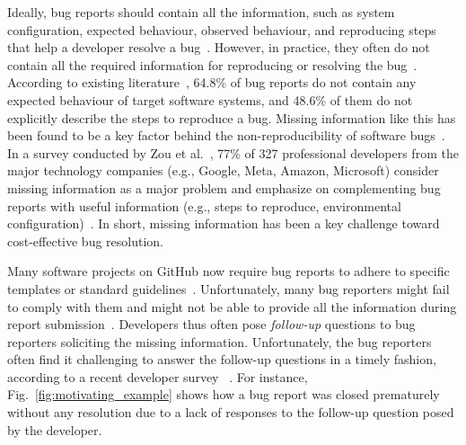 Ideally, bug reports should contain all the information, such as system configuration, expected behaviour, observed behaviour, and reproducing steps that help a developer resolve a bug~\cite{chaparro2017detecting}. However, in practice, they often do not contain all the required information for reproducing or resolving the bug~\cite{chaparro2017detecting}. According to existing literature~\cite{chaparro2017detecting},  64.8\% of bug reports do not contain any expected behaviour of target software systems, and 48.6\% of them do not explicitly describe the steps to reproduce a bug. Missing information like this has been found to be a key factor behind the non-reproducibility of software bugs~\cite{rahman2020some}. In a survey conducted by Zou et al.~\cite{zou2018practitioners}, 77\% of 327 professional developers from the major technology companies (e.g., Google, Meta, Amazon, Microsoft) consider missing information as a major problem and emphasize on complementing bug reports with useful information (e.g., steps to reproduce, environmental configuration)~\cite{zou2018practitioners}. In short, missing information has been a key challenge toward cost-effective bug resolution. \par



Many software projects on GitHub now require bug reports to adhere to specific templates or standard guidelines~\cite{githubguidelines}. Unfortunately, many bug reporters might fail to comply with them and might not be able to provide all the information during report submission~\cite {imran2021automatically}. Developers thus often pose \textit{follow-up} questions to bug reporters soliciting the missing information. Unfortunately, the bug reporters often find it challenging to answer the follow-up questions in a timely fashion, according to a recent developer survey ~\cite{rahman2020some}. For instance, Fig.~\ref{fig:motivating_example} shows how a bug report was closed prematurely without any resolution due to a lack of responses to the follow-up question posed by the developer.\par



